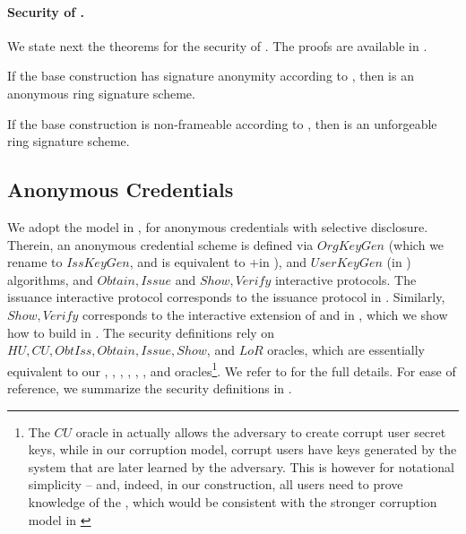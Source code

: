 
\paragraph{Security of \CUASRing.} %
We state next the theorems for the security of \CUASRing. The proofs are
available in .

\begin{theorem}
  If the base \CUASGen construction has signature anonymity according to
  , then \CUASRing is an anonymous ring signature
  scheme.
\end{theorem}

\begin{theorem}
  If the base \CUASGen construction is non-frameable according to
  , then \CUASRing is an unforgeable ring signature
  scheme.
\end{theorem}

\subsection{Anonymous Credentials}
\label{ssec:related-models-ac}

We adopt the model in \cite{fhs19}, for anonymous credentials with selective
disclosure. Therein, an anonymous credential scheme is defined via $OrgKeyGen$
(which we rename to $IssKeyGen$, and is equivalent to \KeyGen+\ISet in \UAS),
and $UserKeyGen$ (\KeyGen in \UAS) algorithms, and $Obtain,Issue$ and $Show,
Verify$ interactive protocols. The issuance interactive protocol corresponds to
the issuance protocol in \UAS. Similarly, $Show,Verify$ corresponds to
the interactive extension of \Sign and \Verify in \UAS, which we show how
to build in . The security definitions rely on
$HU, CU, ObtIss, Obtain, Issue, Show$, and $LoR$ oracles, which are essentially
equivalent to our \UGEN, \UCORR, \OBTISS, \OBTAIN, \ISSUE, \SIGN, and \CHALb
oracles\footnote{The $CU$ oracle in \cite{fhs19} actually allows the adversary
  to create corrupt user secret keys, while in our corruption model, corrupt
  users have keys generated by the system that are later learned by the
  adversary. This is however for notational simplicity -- and, indeed, in our
  construction, all users need to prove knowledge of the \usk, which would be
  consistent with the stronger corruption model in \cite{fhs19}}. We refer to
\cite{fhs19} for the full details. For ease of reference, we summarize the
security definitions in .%


